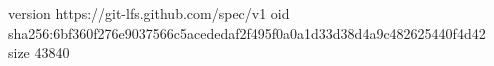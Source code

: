 version https://git-lfs.github.com/spec/v1
oid sha256:6bf360f276e9037566c5acededaf2f495f0a0a1d33d38d4a9c482625440f4d42
size 43840

